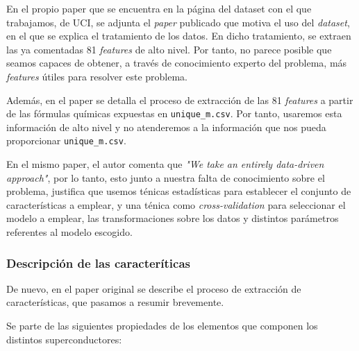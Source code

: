 \documentclass[11pt]{article}
\begin{document}
En el propio paper que se encuentra en la página del dataset con el que trabajamos, de UCI, se adjunta el \emph{paper} publicado que motiva el uso del \emph{dataset}, en el que se explica el tratamiento de los datos. En dicho tratamiento, se extraen las ya comentadas 81 \emph{features} de alto nivel. Por tanto, no parece posible que seamos capaces de obtener, a través de conocimiento experto del problema, más \emph{features} útiles para resolver este problema.

Además, en el paper se detalla el proceso de extracción de las 81 \emph{features} a partir de las fórmulas químicas expuestas en \lstinline{unique_m.csv}. Por tanto, usaremos esta información de alto nivel y no atenderemos a la información que nos pueda proporcionar \lstinline{unique_m.csv}.

En el mismo paper, el autor comenta que \emph{"We take an entirely data-driven approach"}, por lo tanto, esto junto a nuestra falta de conocimiento sobre el problema, justifica que usemos ténicas estadísticas para establecer el conjunto de características a emplear, y una ténica como \emph{cross-validation} para seleccionar el modelo a emplear, las transformaciones sobre los datos y distintos parámetros referentes al modelo escogido.


\subsubsection{Descripción de las caracteríticas}

De nuevo, en el paper original \cite{original_paper_reg:paper} se describe el proceso de extracción de características, que pasamos a resumir brevemente.

Se parte de las siguientes propiedades de los elementos que componen los distintos superconductores:
\end{document}
